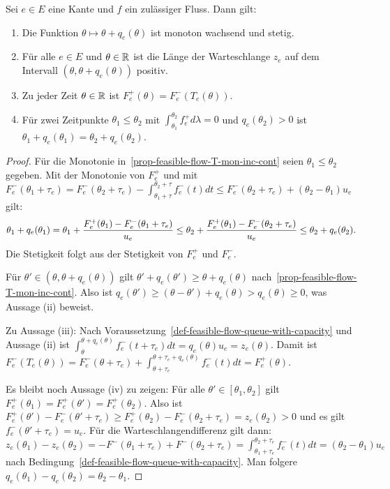 \begin{proposition}\label{prop-feasible-flow}
	Sei $e\in E$ eine Kante und $f$ ein zulässiger Fluss. Dann gilt:
	\begin{enumerate}[label=(\roman*)]
		\item\label{prop-feasible-flow-T-mon-inc-cont} Die Funktion $\theta \mapsto \theta + q_e(\theta)$ ist monoton wachsend und stetig.
		\item\label{prop-feasible-flow-positive-queue} Für alle $e\in E$ und $\theta\in\mathbb{R}$ ist die Länge der Warteschlange $z_e$ auf dem Intervall $(\theta, \theta + q_e(\theta))$ positiv.
		\item\label{prop-feasible-flow-det-outflow} Zu jeder Zeit $\theta\in\mathbb{R}$ ist $F_e^+(\theta) = F_e^-(T_e(\theta))$.
		\item\label{prop-feasible-flow-queue-delay} Für zwei Zeitpunkte $\theta_1 \leq \theta_2$ mit $\int_{\theta_1}^{\theta_2} f^+_e d\lambda = 0$ und $q_e(\theta_2)>0$ ist $\theta_1 + q_e(\theta_1) = \theta_2 + q_e(\theta_2)$.
	\end{enumerate}
\end{proposition}
\begin{proof}
	Für die Monotonie in~\ref{prop-feasible-flow-T-mon-inc-cont} seien $\theta_1 \leq \theta_2$ gegeben.
	Mit der Monotonie von $F_e^+$ und mit $F_e^-(\theta_1 + \tau_e) = F_e^-(\theta_2+\tau_e) - \int_{\theta_1+\tau}^{\theta_2+\tau} f_e^-(t)dt\leq F_e^-(\theta_2 + \tau_e) + (\theta_2 - \theta_1)u_e$ gilt: 
	$$
		\theta_1 + q_e(\theta_1)
		= \theta_1 + \frac{F_e^+(\theta_1) - F_e^-(\theta_1 + \tau_e)}{u_e}\\
		\leq \theta_2 + \frac{F_e^+(\theta_1) - F_e^-(\theta_2+\tau_e)}{u_e} \leq \theta_2 + q_e(\theta_2).
	$$
	Die Stetigkeit folgt aus der Stetigkeit von $F_e^+$ und $F_e^-$.
	
	Für $\theta'\in (\theta, \theta+q_e(\theta))$ gilt $\theta' + q_e(\theta') \geq \theta + q_e(\theta)$ nach~\ref{prop-feasible-flow-T-mon-inc-cont}.
	Also ist $q_e(\theta') \geq (\theta - \theta') + q_e(\theta) > q_e(\theta)\geq 0$, was Aussage (ii) beweist.	
	
	Zu Aussage (iii): Nach Voraussetzung~\ref{def-feasible-flow-queue-with-capacity} und Aussage (ii) ist
	$\int_{\theta}^{\theta + q_e(\theta)}f_e^-(t + \tau_e) dt = q_e(\theta)  u_e = z_e(\theta)$.
	Damit ist $F_e^-(T_e(\theta)) = F_e^-(\theta+\tau_e) + \int_{\theta+\tau_e}^{\theta+\tau_e+q_e(\theta)}f_e^-(t)dt = F_e^+(\theta)$.
	
	Es bleibt noch Aussage (iv) zu zeigen:
	Für alle $\theta'\in [\theta_1, \theta_2]$ gilt $F_e^+(\theta_1) = F_e^+(\theta') = F_e^+(\theta_2)$.
	Also ist $F_e^+(\theta') - F_e^-(\theta' + \tau_e) \geq F_e^+(\theta_2)-F_e^-(\theta_2 + \tau_e) = z_e(\theta_2) > 0$ und es gilt $f_e^-(\theta' + \tau_e)=u_e$.
	Für die Warteschlangendifferenz gilt dann: 
	$z_e(\theta_1)-z_e(\theta_2)=-F^-(\theta_1 + \tau_e) + F^-(\theta_2 + \tau_e) = \int_{\theta_1 + \tau_e}^{\theta_2 + \tau_e} f^-_e(t) dt = (\theta_2 - \theta_1)u_e$ nach Bedingung~\ref{def-feasible-flow-queue-with-capacity}.
	Man folgere $q_e(\theta_1) - q_e(\theta_2) = \theta_2 - \theta_1$.
\end{proof}



